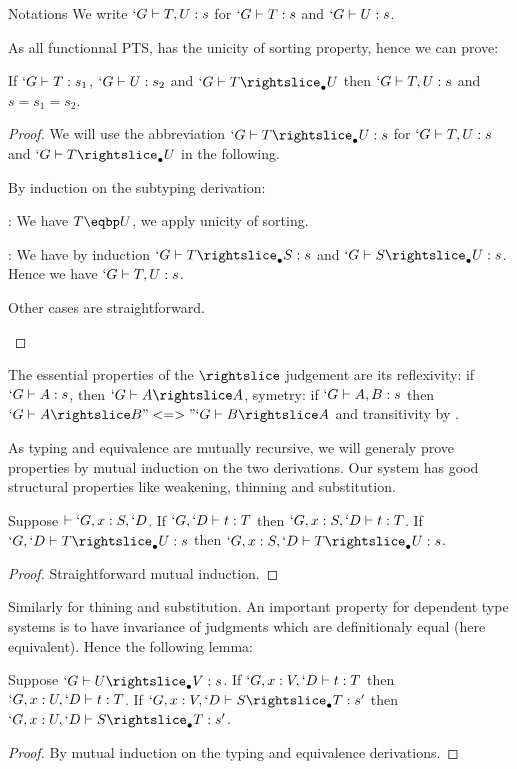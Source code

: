 \documentclass[twocolumn]{article}
\begin{document}
\begin{paragraph}{Notations}
  We write $`G \vdash T, U : s$ for $`G \vdash T : s$ and $`G \vdash U :
  s$.
\end{paragraph}

As all functionnal PTS, \Russell{} has the unicity of sorting property,
hence we can prove:
\begin{lemma}
  If $`G \vdash T : s_1$, $`G \vdash U : s_2$ and $`G \typed T \sub U$
  then $`G \vdash T, U : s$ and $s = s_1 = s_2$.
\end{lemma}
\begin{proof}
  We will use the abbreviation $`G \typed T \sub U : s$ for $`G \vdash T,
  U : s$ and $`G \typed T \sub U$ in the following.

  By induction on the subtyping derivation:
  \begin{list}{}
  \item[] : We have $T \eqbp U$, we apply unicity of sorting.
    
  \item[] : We have by induction $`G \typed T \sub S : s$ and 
    $`G \typed S \sub U : s$. Hence we have $`G \vdash T, U : s$.
    
  \item[] Other cases are straightforward.
  \end{list}
\end{proof}

The essential properties of the $\subd$ judgement are 
its reflexivity: if $`G \vdash A : s$, then $`G \typed A \subd A$,
symetry: if $`G \vdash A, B : s$ then $`G \typed A \subd B "<=>" `G \typed
B \subd A$ and transitivity by .

As typing and equivalence are mutually recursive, we will generaly prove
properties by mutual induction on the two derivations.
Our system has good structural properties like weakening, thinning and
substitution. 

\begin{lemma}[Weakening]
  Suppose $\vdash `G, x : S, `D$.
  If $`G, `D \vdash t : T$ then $`G, x : S, `D \vdash t : T$. 
  If $`G, `D \typed T \sub U : s$ then $`G, x : S, `D \typed T \sub U : s$.
\end{lemma}
\begin{proof}
  Straightforward mutual induction.
\end{proof}

Similarly for thining and substitution. An important property for
dependent type systems is to have invariance of judgments which are
definitionaly equal (here equivalent). Hence the following lemma:
\begin{lemma}
  Suppose $`G \typed U \sub V : s$.
  If $`G, x : V, `D \vdash t : T$ then $`G, x : U, `D \vdash t : T$.
  If $`G, x : V, `D \typed S \sub T : s'$ then
  $`G, x : U, `D \typed S \sub T : s'$.
\end{lemma}
\begin{proof}
  By mutual induction on the typing and equivalence derivations.
\end{proof}
\end{document}
